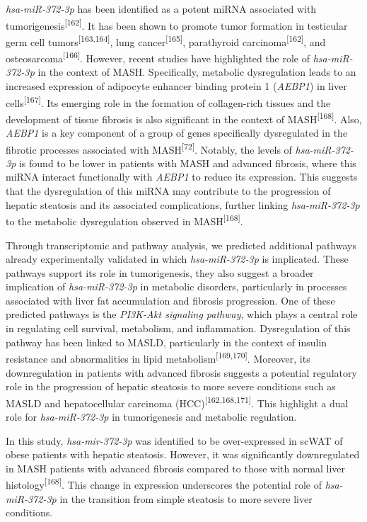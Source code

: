 \documentclass[
  11pt,
  letterpaper,
]{book}
\begin{document}
\emph{hsa-miR-372-3p} has been identified as a potent miRNA associated
with tumorigenesis\textsuperscript{{[}162{]}}. It has been shown to
promote tumor formation in testicular germ cell
tumors\textsuperscript{{[}163,164{]}}, lung
cancer\textsuperscript{{[}165{]}}, parathyroid
carcinoma\textsuperscript{{[}162{]}}, and
osteosarcoma\textsuperscript{{[}166{]}}. However, recent studies have
highlighted the role of \emph{hsa-miR-372-3p} in the context of MASH.
Specifically, metabolic dysregulation leads to an increased expression
of adipocyte enhancer binding protein 1 (\emph{AEBP1}) in liver
cells\textsuperscript{{[}167{]}}. Its emerging role in the formation of
collagen-rich tissues and the development of tissue fibrosis is also
significant in the context of MASH\textsuperscript{{[}168{]}}. Also,
\emph{AEBP1} is a key component of a group of genes specifically
dysregulated in the fibrotic processes associated with
MASH\textsuperscript{{[}72{]}}. Notably, the levels of
\emph{hsa-miR-372-3p} is found to be lower in patients with MASH and
advanced fibrosis, where this miRNA interact functionally with
\emph{AEBP1} to reduce its expression. This suggests that the
dysregulation of this miRNA may contribute to the progression of hepatic
steatosis and its associated complications, further linking
\emph{hsa-miR-372-3p} to the metabolic dysregulation observed in
MASH\textsuperscript{{[}168{]}}.

Through transcriptomic and pathway analysis, we predicted additional
pathways already experimentally validated in which \emph{hsa-miR-372-3p}
is implicated. These pathways support its role in tumorigenesis, they
also suggest a broader implication of \emph{hsa-miR-372-3p} in metabolic
disorders, particularly in processes associated with liver fat
accumulation and fibrosis progression. One of these predicted pathways
is the \emph{PI3K-Akt signaling pathway}, which plays a central role in
regulating cell survival, metabolism, and inflammation. Dysregulation of
this pathway has been linked to MASLD, particularly in the context of
insulin resistance and abnormalities in lipid
metabolism\textsuperscript{{[}169,170{]}}. Moreover, its downregulation
in patients with advanced fibrosis suggests a potential regulatory role
in the progression of hepatic steatosis to more severe conditions such
as MASLD and hepatocellular carcinoma
(HCC)\textsuperscript{{[}162,168,171{]}}. This highlight a dual role for
\emph{hsa-miR-372-3p} in tumorigenesis and metabolic regulation.

In this study, \emph{hsa-mir-372-3p} was identified to be over-expressed
in scWAT of obese patients with hepatic steatosis. However, it was
significantly downregulated in MASH patients with advanced fibrosis
compared to those with normal liver
histology\textsuperscript{{[}168{]}}. This change in expression
underscores the potential role of \emph{hsa-miR-372-3p} in the
transition from simple steatosis to more severe liver conditions.
\end{document}
